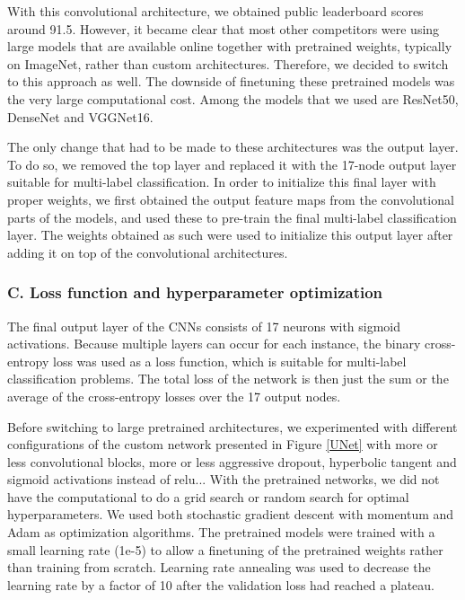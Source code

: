 \documentclass[fleqn]{homework}
\begin{document}
With this convolutional architecture, we obtained public leaderboard scores around 91.5. However, it became clear that most other competitors were using large models that are available online together with pretrained weights, typically on ImageNet, rather than custom architectures. Therefore, we decided to switch to this approach as well. The downside of finetuning these pretrained models was the very large computational cost. Among the models that we used are ResNet50, DenseNet and VGGNet16.

The only change that had to be made to these architectures was the output layer. To do so, we removed the top layer and replaced it with the 17-node output layer suitable for multi-label classification. In order to initialize this final layer with proper weights, we first obtained the output feature maps from the convolutional parts of the models, and used these to pre-train the final multi-label classification layer. The weights obtained as such were used to initialize this output layer after adding it on top of the convolutional architectures.

\subsubsection*{C. Loss function and hyperparameter optimization}
The final output layer of the CNNs consists of 17 neurons with sigmoid activations. Because multiple layers can occur for each instance, the binary cross-entropy loss was used as a loss function, which is suitable for multi-label classification problems. The total loss of the network is then just the sum or the average of the cross-entropy losses over the 17 output nodes.

Before switching to large pretrained architectures, we experimented with different configurations of the custom network presented in Figure \ref{UNet} with more or less convolutional blocks, more or less aggressive dropout, hyperbolic tangent and sigmoid activations instead of relu... With the pretrained networks, we did not have the computational to do a grid search or random search for optimal hyperparameters. We used both stochastic gradient descent with momentum and Adam as optimization algorithms. The pretrained models were trained with a small learning rate (1e-5) to allow a finetuning of the pretrained weights rather than training from scratch. Learning rate annealing was used to decrease the learning rate by a factor of 10 after the validation loss had reached a plateau. 
\end{document}
